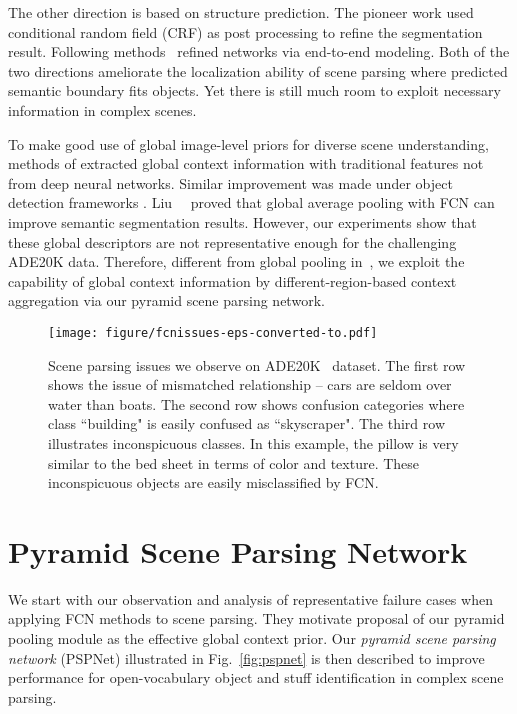 \documentclass[10pt,twocolumn,letterpaper]{article}
\begin{document}
The other direction is based on structure prediction. The pioneer work
\cite{chen2014semantic} used conditional random field (CRF) as post processing to refine
the segmentation result. Following
methods~\cite{liu2015semantic,zheng2015conditional,arnab2016higher} refined networks via
end-to-end modeling. Both of the two directions ameliorate the localization ability of
scene parsing where predicted semantic boundary fits objects. Yet there is still much
room to exploit necessary information in complex scenes.

To make good use of global image-level priors for diverse scene understanding, methods of
\cite{lazebnik2006beyond,lucchi2011spatial} extracted global context information with
traditional features not from deep neural networks. Similar improvement was made under
object detection frameworks \cite{szegedy2014scalable}. Liu~\etal~\cite{liu2015parsenet}
proved that global average pooling with FCN can improve semantic segmentation results.
However, our experiments show that these global descriptors are not representative enough
for the challenging ADE20K data. Therefore, different from global pooling
in~\cite{liu2015parsenet}, we exploit the capability of global context information by
different-region-based context aggregation via our pyramid scene parsing network.

\begin{figure*}
\begin{center}
\texttt{[image: figure/fcnissues-eps-converted-to.pdf]}
\end{center}
\caption{Scene parsing issues we observe on ADE20K~\cite{zhou2016semantic} dataset. The
first row shows the issue of mismatched relationship -- cars are seldom over water than
boats. The second row shows confusion categories where class ``building" is easily
confused as ``skyscraper". The third row illustrates inconspicuous classes. In this
example, the pillow is very similar to the bed sheet in terms of color and texture. These
inconspicuous objects are easily misclassified by FCN. } \label{fig:fcnissues}
\end{figure*}

\section{Pyramid Scene Parsing Network}

We start with our observation and analysis of representative failure cases when applying
FCN methods to scene parsing. They motivate proposal of our pyramid pooling module as the
effective global context prior. Our {\it pyramid scene parsing network} (PSPNet)
illustrated in Fig.~\ref{fig:pspnet} is then described to improve performance for
open-vocabulary object and stuff identification in complex scene parsing.
\end{document}
